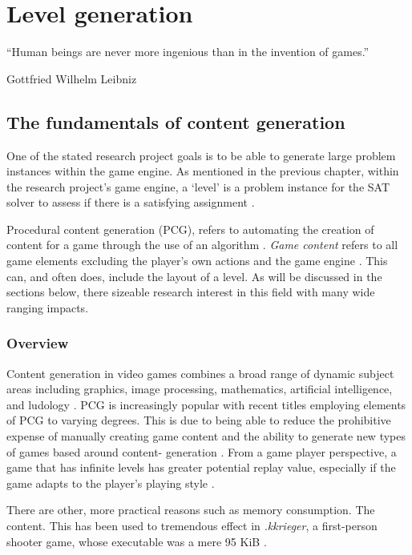 \documentclass[11pt, a4paper, oneside]{report} %
\begin{document}
\chapter{Level generation}


\epigraph{``Human beings are never more ingenious than in the invention of games.''}{Gottfried
Wilhelm Leibniz}


\section{The fundamentals of content generation}

One of the stated research project goals is to be able to generate large problem instances within
the game engine. As mentioned in the previous chapter, within the research project's game engine, a
`level' is a problem instance for the SAT solver to assess if there is a satisfying assignment
\cite{Aloupis2012} .

Procedural content generation (PCG), refers to automating the creation of content for a game through
the use of an algorithm \cite{Hendrikx:2013:PCG:2422956.2422957, 5756645}. \textit{Game content}
refers to all game elements excluding the player's own actions and the game engine
\cite{Burgun:2012}. This can, and often does, include the layout of a level. As will be discussed in
the sections below, there sizeable research interest in this field with many wide ranging impacts.

\subsection{Overview}

Content generation in video games combines a broad range of dynamic subject areas including
graphics, image processing, mathematics, artificial intelligence, and ludology
\cite{Hendrikx:2013:PCG:2422956.2422957}. PCG is increasingly popular with recent titles employing
elements of PCG to varying degrees. This is due to being able to reduce the prohibitive expense of
manually creating game content \cite{Hendrikx:2013:PCG:2422956.2422957} and the ability to generate
new types of games based around content- generation \cite{5756645}. From a game player perspective,
a game that has infinite levels has greater potential replay value, especially if the game adapts to
the player's playing style \cite{6424299}. 

There are other, more practical reasons such as memory
consumption. The content. This has been used to tremendous effect in \textit{.kkrieger}, a
first-person shooter game, whose executable was a mere 95 KiB
\cite{Hendrikx:2013:PCG:2422956.2422957}. 
\end{document}
